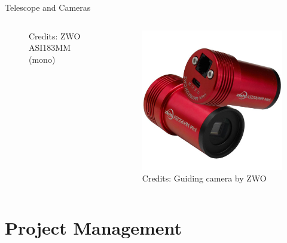 \documentclass[11pt, aspectratio=169]{beamer}
\begin{document}
\begin{frame}[c]{Telescope and Cameras}
\begin{columns}
\begin{column}{0.3\textwidth}
\begin{figure}[c]
            \caption*{Credits: ZWO ASI183MM (mono)}
        \end{figure}
    \end{column}
    \begin{column}{0.3\textwidth}
        \begin{figure}[c]
            \centering
            \includegraphics[width=\linewidth]{figures/images/ZWO_ASI290MM_Mini.jpg}
            \caption*{Credits: Guiding camera by ZWO}
        \end{figure}
    \end{column}
    \end{columns}
\end{frame}
\section{Project Management}
\end{document}
